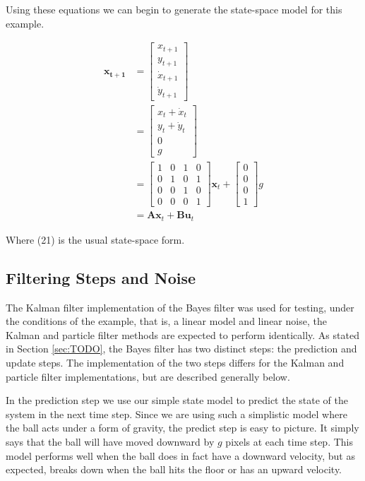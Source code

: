 Using these equations we can begin to generate the state-space model for this
example.

\begin{align}
\mathbf{x_{t+1}} &=
\begin{bmatrix}
x_{t+1} \\ y_{t+1} \\ \dot{x}_{t+1} \\ \dot{y}_{t+1}
\end{bmatrix}
\\
&=
\begin{bmatrix}
x_{t} + \dot{x}_{t} \\ y_{t} + \dot{y}_{t} \\ 0 \\ g
\end{bmatrix}
\\
&=
\begin{bmatrix}
1 & 0 & 1 & 0 \\ 0 & 1 & 0 & 1 \\ 0 & 0 & 1 & 0 \\ 0 & 0 & 0 & 1
\end{bmatrix}
\mathbf{x}_{t} + 
\begin{bmatrix}
0 \\ 0 \\ 0 \\ 1
\end{bmatrix}
g
\\
&=
\mathbf{Ax}_{t} + \mathbf{Bu}_{t}
\end{align}

Where (21) is the usual state-space form.

\subsection{Filtering Steps and Noise}
The Kalman filter implementation of the Bayes filter was used for testing, under
the conditions of the example, that is, a linear model and linear noise,
the Kalman and particle filter methods are expected to perform identically. As
stated in Section \ref{sec:TODO}, the Bayes filter has two distinct steps:
the prediction and update steps. The implementation of the two steps differs
for the Kalman and particle filter implementations, but are described generally
below.

In the prediction step we use our simple state
model to predict the state of the system in the next time step. Since we are using
such a simplistic model where the ball acts under a form of gravity, the predict
step is easy to picture. It simply says that the ball will have moved downward by
$g$ pixels at each time step. This model performs well when the ball does in fact
have a downward velocity, but as expected, breaks down when the ball hits the floor
or has an upward velocity.

